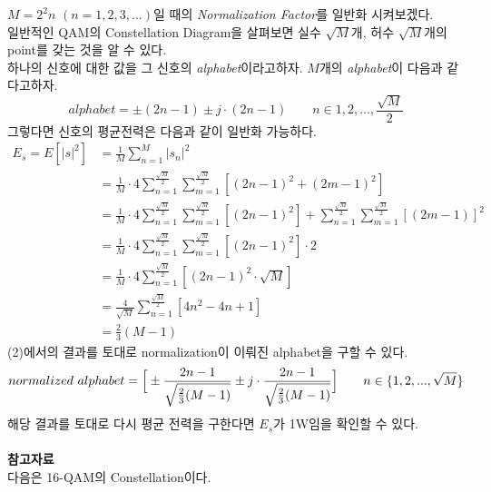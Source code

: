 \documentclass{article}
\newcommand{\bd}{\textbf} %
\providecommand{\abs}[1]{\lvert#1\rvert}
\begin{document}
$M=2^2n$ $(n=1,2,3,...)$일 때의 \textsl{Normalization Factor}를 일반화 시켜보겠다.\\
일반적인 QAM의 Constellation Diagram을 살펴보면 실수 $\sqrt{M}$개, 허수 $\sqrt{M}$개의 point를 갖는 것을 알 수 있다.\\
하나의 신호에 대한 값을 그 신호의 \textsl{alphabet}이라고하자. $M$개의 \textsl{alphabet}이 다음과 같다고하자.
\begin{equation}
alphabet={\pm(2n-1)\pm j\cdot(2n-1)} \qquad n\in{1,2,...,\frac{\sqrt{M}}{2}}
\end{equation}
그렇다면 신호의 평균전력은 다음과 같이 일반화 가능하다.
\begin{equation}
\begin{split}
E_s=E[\abs{s}^2]&=\frac{1}{M}\sum_{n=1}^M \abs{s_n}^2\\
&=\frac{1}{M}\cdot4\sum_{n=1}^{\frac{\sqrt{M}}{2}} \sum_{m=1}^{\frac{\sqrt{M}}{2}} [(2n-1)^2+(2m-1)^2]\\
&=\frac{1}{M}\cdot4\sum_{n=1}^{\frac{\sqrt{M}}{2}} \sum_{m=1}^{\frac{\sqrt{M}}{2}} [(2n-1)^2] + \sum_{n=1}^{\frac{\sqrt{M}}{2}} \sum_{m=1}^{\frac{\sqrt{M}}{2}}[(2m-1)]^2\\
&=\frac{1}{M}\cdot4\sum_{n=1}^{\frac{\sqrt{M}}{2}} \sum_{m=1}^{\frac{\sqrt{M}}{2}} [(2n-1)^2]\cdot2\\
&=\frac{1}{M}\cdot4\sum_{n=1}^\frac{\sqrt{M}}{2}[(2n-1)^2\cdot\sqrt{M}]\\
&=\frac{4}{\sqrt{M}}\sum_{n=1}^\frac{\sqrt{M}}{2}[4n^2-4n+1]\\
&=\frac{2}{3}(M-1)
\end{split}
\end{equation}
(2)에서의 결과를 토대로 normalization이 이뤄진 alphabet을 구할 수 있다.
\begin{equation}
normalized\ alphabet=\Big{[}\pm\frac{2n-1}{\sqrt{\frac{2}{3}(M-1)}}\pm j\cdot\frac{2n-1}{\sqrt{\frac{2}{3}(M-1)}}\Big{]} \qquad n\in\{1,2,...,\sqrt{M}\}
\end{equation}
해당 결과를 토대로 다시 평균 전력을 구한다면 $E_s$가 1W임을 확인할 수 있다.\\
\\
\bd{참고자료}\\
다음은 16-QAM의 Constellation이다.\\
\end{document}
